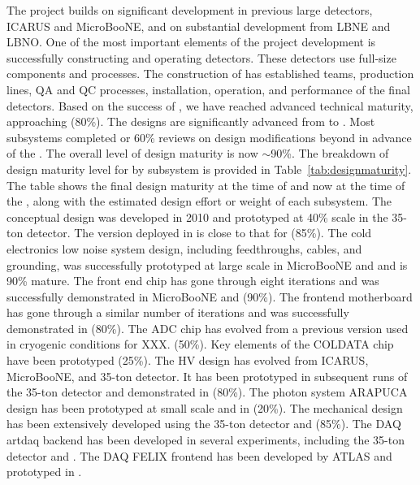 The  project builds on significant development in previous
large  detectors, ICARUS and MicroBooNE, and on
substantial development from LBNE and LBNO. One of the most important
elements of the project development is successfully constructing and
operating  detectors. These detectors use full-size
 components and processes. The construction of
 has established teams, production lines, QA and QC
processes, installation, operation, and performance of the final
 detectors. Based on the success of , we
have reached advanced technical maturity, approaching (80\%). The
designs are significantly advanced from  to
. Most subsystems completed  or 60\% reviews on
design modifications beyond  in advance of the
. The overall level of design maturity is now
$\sim$90\%. The breakdown of design maturity level for  by
subsystem is provided in Table~\ref{tab:designmaturity}. The table
shows the final  design maturity at the time of
 and now at the time of the , along with
the estimated design effort or weight of each subsystem. The
 conceptual design was developed in 2010 and prototyped at
40\% scale in the 35-ton detector. The version deployed in
 is close to that for  (85\%). The cold
electronics low noise system design, including feedthroughs, cables,
and grounding, was successfully prototyped at large scale in
MicroBooNE and  and is 90\% mature. The front end chip has
gone through eight iterations and was successfully demonstrated in
MicroBooNE and  (90\%). The frontend motherboard has gone
through a similar number of iterations and was successfully
demonstrated in  (80\%). The ADC chip has evolved from a
previous version used in cryogenic conditions for XXX. (50\%). Key
elements of the COLDATA chip have been prototyped (25\%). The HV
design has evolved from ICARUS, MicroBooNE, and 35-ton detector.  It
has been prototyped in subsequent runs of the 35-ton detector and
demonstrated in  (80\%). The photon system ARAPUCA design
has been prototyped at small scale and in  (20\%). The
mechanical design has been extensively developed using the 35-ton
detector and  (85\%). The DAQ artdaq backend has been
developed in several experiments, including the 35-ton detector and
. The DAQ FELIX frontend has been developed by ATLAS and
prototyped in .
